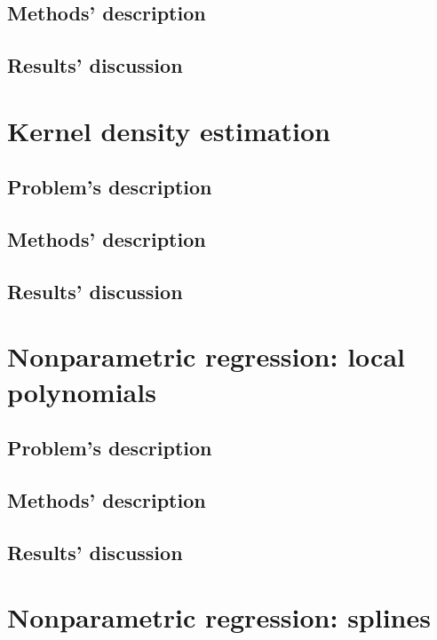 \documentclass{report}
\begin{document}
\section{Methods' description}

\section{Results' discussion}


\chapter{Kernel density estimation}
\section{Problem's description}

\section{Methods' description}

\section{Results' discussion}


\chapter{Nonparametric regression: local polynomials}
\section{Problem's description}

\section{Methods' description}

\section{Results' discussion}


\chapter{Nonparametric regression: splines}
\end{document}
